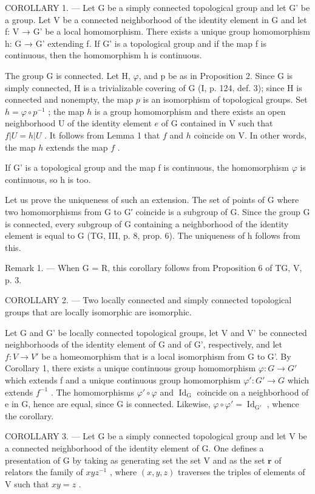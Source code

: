 COROLLARY 1. --- Let G be a simply connected topological group and let G' be a group. Let V be a connected neighborhood of the identity element in G and let f: V → G' be a local homomorphism. There exists a unique group homomorphism h: G → G' extending f. If G' is a topological group and if the map f is continuous, then the homomorphism h is continuous.

The group G is connected. Let H, \(\varphi\), and p be as in Proposition 2. Since G is simply connected, H is a trivializable covering of G (I, p. 124, def. 3); since H is connected and nonempty, the map \(p\) is an isomorphism of topological groups. Set \(h = \varphi \circ p^{-1}\) ; the map \(h\) is a group homomorphism and there exists an open neighborhood U of the identity element \(e\) of G contained in V such that \(f|U = h|U\) . It follows from Lemma 1 that \(f\) and \(h\) coincide on V. In other words, the map \(h\) extends the map \(f\) .

If G' is a topological group and the map f is continuous, the homomorphism \(\varphi\) is continuous, so h is too.

Let us prove the uniqueness of such an extension. The set of points of G where two homomorphisms from G to G′ coincide is a subgroup of G. Since the group G is connected, every subgroup of G containing a neighborhood of the identity element is equal to G (TG, III, p. 8, prop. 6). The uniqueness of h follows from this.

Remark 1. --- When G = R, this corollary follows from Proposition 6 of TG, V, p. 3.

COROLLARY 2. --- Two locally connected and simply connected topological groups that are locally isomorphic are isomorphic.

Let G and G' be locally connected topological groups, let V and V' be connected neighborhoods of the identity element of G and of G', respectively, and let \(f: V \to V'\) be a homeomorphism that is a local isomorphism from G to G'. By Corollary 1, there exists a unique continuous group homomorphism \(\varphi: G \to G'\) which extends f and a unique continuous group homomorphism \(\varphi': G' \to G\) which extends \(f^{-1}\) . The homomorphisms \(\varphi' \circ \varphi\) and \(\operatorname{Id}_{\mathrm{G}}\) coincide on a neighborhood of e in G, hence are equal, since G is connected. Likewise, \(\varphi \circ \varphi' = \operatorname{Id}_{\mathrm{G}'}\) , whence the corollary.

COROLLARY 3. --- Let G be a simply connected topological group and let V be a connected neighborhood of the identity element of G. One defines a presentation of G by taking as generating set the set V and as the set \(\mathbf{r}\) of relators the family of \(xyz^{-1}\) , where \((x,y,z)\) traverses the triples of elements of V such that \(xy = z\) .

